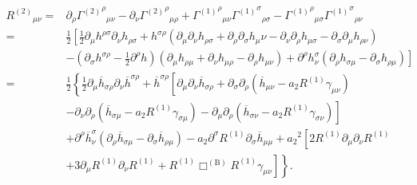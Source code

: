 \documentclass[a4paper, 11pt, titlepage, twoside]{report}
\newcommand{\recip}[1]{\ensuremath{\frac{1}{#1}}}
\begin{document}
\begin{align}
{R^{(2)}}_{\mu\nu} = {} & \partial_\rho {{\Gamma^{(2)}}^\rho}_{\mu\nu} - \partial_\nu {{\Gamma^{(2)}}^\rho}_{\mu\rho} + {{\Gamma^{(1)}}^\rho}_{\mu\nu}{{\Gamma^{(1)}}^\sigma}_{\rho\sigma} - {{\Gamma^{(1)}}^\rho}_{\mu\sigma}{{\Gamma^{(1)}}^\sigma}_{\rho\nu} \nonumber \\
 = {} & \frac{1}{2}\left[\frac{1}{2}\partial_\mu h^{\rho\sigma}\partial_\nu h_{\rho\sigma} + h^{\sigma\rho}\left(\partial_\mu\partial_\nu h_{\rho\sigma} + \partial_\rho\partial_\sigma h_\mu\nu - \partial_\nu\partial_\rho h_{\mu\sigma} - \partial_\sigma\partial_\mu h_{\rho\nu}\right) \right.  \nonumber \\
 & - \left.  \left(\partial_\sigma h^{\sigma\rho} - \frac{1}{2}\partial^\rho h\right)\left(\partial_\mu h_{\rho\mu} + \partial_\nu h_{\mu\rho} - \partial_\rho h_{\mu\nu}\right) + \partial^\rho h^\sigma_\nu\left(\partial_\rho h_{\sigma\mu} - \partial_\sigma h_{\rho\mu}\right) \right] \nonumber \\
 = {} & \frac{1}{2}\left\{\recip{2}\partial_\mu\overline{h}_{\sigma\rho}\partial_\nu\overline{h}^{\sigma\rho} + \overline{h}^{\sigma\rho}\left[\partial_\mu\partial_\nu\overline{h}_{\sigma\rho} + \partial_\sigma\partial_\rho\left(\overline{h}_{\mu\nu} - a_2 R^{(1)}\gamma_{\mu\nu}\right) \right.\right. \nonumber \\
 & - \left.\left. \partial_\nu\partial_\rho\left(\overline{h}_{\sigma\mu} - a_2 R^{(1)} \gamma_{\sigma\mu}\right) - \partial_\mu\partial_\rho\left(\overline{h}_{\sigma\nu} - a_2 R^{(1)} \gamma_{\sigma\nu}\right)\right] \right. \nonumber \\
 & + \left. \partial^\rho\overline{h}^\sigma_\nu\left(\partial_\rho\overline{h}_{\sigma\mu} - \partial_\sigma\overline{h}_{\rho\mu}\right) - a_2 \partial^\sigma R^{(1)}\partial_\sigma\overline{h}_{\mu\mu} + {a_2}^2 \left[2R^{(1)}\partial_\mu\partial_\nu R^{(1)} \right.\right. \nonumber \\
 & + \left.\left. 3\partial_\mu R^{(1)}\partial_\nu R^{(1)} + R^{(1)} \Box^{(\mathrm{B})} R^{(1)} \gamma_{\mu\nu}\right]\right\}.
\end{align}
\end{document}
